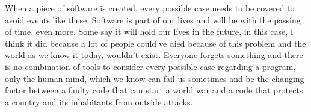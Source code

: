 \documentclass[compilation.tex]{subfiles}
\begin{document}
When a piece of software is created, every possible case needs to be covered to avoid events like these.
Software is part of our lives and will be with the passing of time, even more.
Some say it will hold our lives in the future, in this case, I think it did because a lot of people could’ve died because of this problem and the world as we know it today, wouldn’t exist.
Everyone forgets something and there is no combination of tools to consider every possible case regarding a program, only the human mind, which we know can fail us sometimes and be the changing factor between a faulty code that can start a world war and a code that protects a country and its inhabitants from outside attacks.

\nocite{*}
\end{document}
